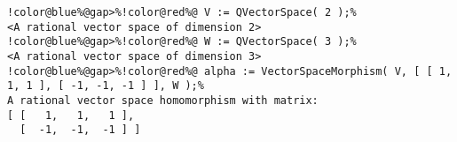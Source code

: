 \begin{Verbatim}[commandchars=!@\%,frame=single]
!color@blue%@gap>%!color@red%@ V := QVectorSpace( 2 );%
<A rational vector space of dimension 2>
!color@blue%@gap>%!color@red%@ W := QVectorSpace( 3 );%
<A rational vector space of dimension 3>
!color@blue%@gap>%!color@red%@ alpha := VectorSpaceMorphism( V, [ [ 1, 1, 1 ], [ -1, -1, -1 ] ], W );%
A rational vector space homomorphism with matrix: 
[ [   1,   1,   1 ],
  [  -1,  -1,  -1 ] ]
\end{Verbatim}
